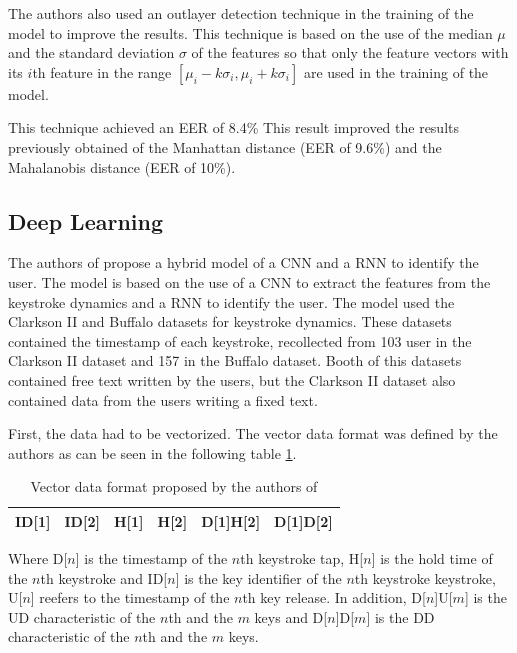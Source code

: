The authors also used an outlayer detection technique in the training of the model to improve the results. This technique is based on the use of the median $\mu$ and the standard deviation $\sigma$ of the features so that only the feature vectors with  its $i$th feature in the range $[\mu_i - k\sigma_i, \mu_i + k\sigma_i]$ are used in the training of the model.

This technique achieved an EER of 8.4\% This result improved the results previously obtained \cite{killourhy2009comparing} of the Manhattan distance (EER of 9.6\%) and the Mahalanobis distance (EER of 10\%).

\subsection{Deep Learning}

The authors of \cite{deep_learning} propose a hybrid model of a CNN and a RNN to identify the user. The model is based on the use of a CNN to extract the features from the keystroke dynamics and a RNN to identify the user. The model used the Clarkson II and Buffalo datasets for keystroke dynamics. These datasets contained the timestamp of each keystroke, recollected from 103 user in the Clarkson II dataset and 157 in the Buffalo dataset. Booth of this datasets contained free text written by the users, but the Clarkson II dataset also contained data from the users writing a fixed text.

First, the data had to be vectorized. The vector data format was defined by the authors as can be seen in the following table \ref{tab:deep_learning_vector_data_format}.

\begin{table}[H]
	\centering
	\begin{tabular}{|c|c|c|c|c|c|}
		\hline
		ID{[}1{]} & ID{[}2{]} & H{[}1{]} & H{[}2{]} & D{[}1{]}H{[}2{]} & D{[}1{]}D{[}2{]} \\ \hline
	\end{tabular}
	\caption{Vector data format proposed by the authors of \cite{deep_learning}}
	\label{tab:deep_learning_vector_data_format}
\end{table}

Where D[$n$] is the timestamp of the $n$th keystroke tap, H[$n$] is the hold time of the $n$th keystroke and ID[$n$] is the key identifier of the $n$th keystroke keystroke, U[$n$] reefers to the timestamp of the $n$th key release. In addition, D[$n$]U[$m$] is the UD characteristic of the $n$th and the $m$ keys and D[$n$]D[$m$] is the DD characteristic of the $n$th and the $m$ keys.

